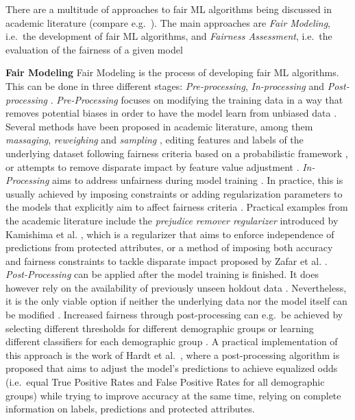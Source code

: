 There are a multitude of approaches to fair ML algorithms being discussed in academic literature (compare e.g.\ \cite{Mehrabi2021}). The main approaches are \textit{Fair Modeling}, i.e.\ the development of fair ML algorithms, and \textit{Fairness Assessment}, i.e.\ the evaluation of the fairness of a given model

\textbf{Fair Modeling} \newline
Fair Modeling is the process of developing fair ML algorithms. This can be done in three different stages: \textit{Pre-processing}, \textit{In-processing} and \textit{Post-processing} \parencite{Pessach2020}. \newline
\textit{Pre-Processing} focuses on modifying the training data in a way that removes potential biases in order to have the model learn from unbiased data \parencite{Bellamy2019}.
Several methods have been proposed in academic literature, among them \textit{massaging}, \textit{reweighing} and \textit{sampling} \parencite{Kamiran2012}, editing features and labels of the underlying dataset following fairness criteria based on a probabilistic framework \parencite{Calmon2017}, or attempts to remove disparate impact by feature value adjustment \parencite{Feldman2015}. \newline
\textit{In-Processing} aims to address unfairness during model training \parencite{Alessandro2017}. In practice, this is usually achieved by imposing constraints or adding regularization parameters to the models that explicitly aim to affect fairness criteria \parencite{Pessach2020}.
Practical examples from the academic literature include the \textit{prejudice remover regularizer} introduced by Kamishima et al. \parencite{Kamishima2012}, which is a regularizer that aims to enforce independence of predictions from protected attributes, or a method of imposing both accuracy and fairness constraints to tackle disparate impact proposed by Zafar et al. \parencite{Zafar2017}. \newline
\textit{Post-Processing} can be applied after the model training is finished. It does however rely on the availability of previously unseen holdout data \parencite{Alessandro2017}. Nevertheless, it is the only viable option if neither the underlying data nor the model itself can be modified \parencite{Bellamy2019}.
Increased fairness through post-processing can e.g.\ be achieved by selecting different thresholds for different demographic groups or learning different classifiers for each demographic group \parencite{Pessach2020}.
A practical implementation of this approach is the work of Hardt et al.\ \parencite{Hardt2016}, where a post-processing algorithm is proposed that aims to adjust the model's predictions to achieve equalized odds (i.e.\ equal True Positive Rates and False Positive Rates for all demographic groups) while trying to improve accuracy at the same time, relying on complete information on labels, predictions and protected attributes. 

